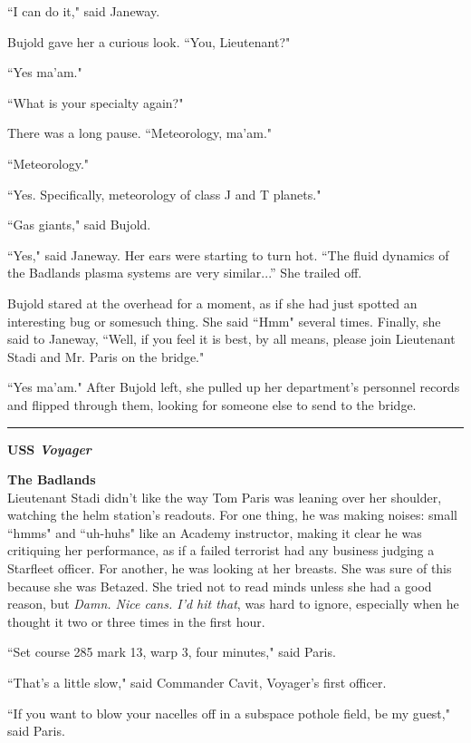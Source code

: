\documentclass[twoside,letterpaper,12pt]{memoir}
\begin{document}
``I can do it," said Janeway.

Bujold gave her a curious look. ``You, Lieutenant?"

``Yes ma'am."

``What is your specialty again?"

There was a long pause. ``Meteorology, ma'am."

``Meteorology."

``Yes. Specifically, meteorology of class J and T planets."

``Gas giants," said Bujold.

``Yes," said Janeway. Her ears were starting to turn hot. ``The fluid dynamics of the Badlands plasma systems are very similar...'' She trailed off.

Bujold stared at the overhead for a moment, as if she had just spotted an interesting bug or somesuch thing. She said ``Hmm" several times. Finally, she said to Janeway, ``Well, if you feel it is best, by all means, please join Lieutenant Stadi and Mr. Paris on the bridge."

``Yes ma'am." After Bujold left, she pulled up her department's personnel records and flipped through them, looking for someone else to send to the bridge.

\begin{center}\rule{3cm}{0.4 pt}\end{center}

\noindent\textbf{USS \textit{Voyager}}

\noindent\textbf{The Badlands}\\

Lieutenant Stadi didn't like the way Tom Paris was leaning over her shoulder, watching the helm station's readouts. For one thing, he was making noises: small ``hmms" and ``uh-huhs" like an Academy instructor, making it clear he was critiquing her performance, as if a failed terrorist had any business judging a Starfleet officer. For another, he was looking at her breasts. She was sure of this because she was Betazed. She tried not to read minds unless she had a good reason, but \textit{Damn. Nice cans. I'd hit that}, was hard to ignore, especially when he thought it two or three times in the first hour.

``Set course 285 mark 13, warp 3, four minutes," said Paris.

``That's a little slow," said Commander Cavit, Voyager's first officer.

``If you want to blow your nacelles off in a subspace pothole field, be my guest," said Paris.
\end{document}
